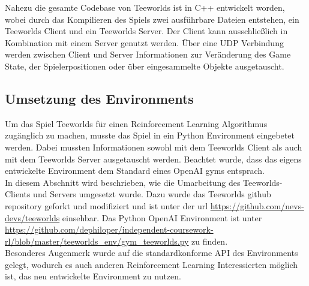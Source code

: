 \documentclass[11pt]{scrartcl}
\begin{document}
Nahezu die gesamte Codebase von Teeworlds ist in C++ entwickelt worden, wobei durch das Kompilieren
des Spiels zwei ausführbare Dateien entstehen, ein Teeworlds Client und ein Teeworlds Server. Der
Client kann ausschließlich in Kombination mit einem Server genutzt werden. Über eine UDP Verbindung
werden zwischen Client und Server Informationen zur Veränderung des Game State, der Spielerpositionen
oder über eingesammelte Objekte ausgetauscht.

\subsection{Umsetzung des Environments} %
Um das Spiel Teeworlds für einen Reinforcement Learning Algorithmus zugänglich zu machen,
musste das Spiel in ein Python Environment eingebetet werden. Dabei mussten Informationen
sowohl mit dem Teeworlds Client als auch mit dem Teeworlds Server ausgetauscht werden.
Beachtet wurde, dass das eigens entwickelte Environment dem Standard eines OpenAI gyms
entsprach.\\
In diesem Abschnitt wird beschrieben, wie die Umarbeitung des Teeworlds-Clients und
Servers umgesetzt wurde. Dazu wurde das Teeworlds github repository geforkt und
modifiziert und ist unter der url \url{https://github.com/nevs-devs/teeworlds} einsehbar.
Das Python OpenAI Environment ist unter
\url{https://github.com/dephiloper/independent-coursework-rl/blob/master/teeworlds_env/gym_teeworlds.py}
zu finden.\\
Besonderes Augenmerk wurde auf die standardkonforme API des Environments gelegt, wodurch
es auch anderen Reinforcement Learning Interessierten möglich ist, das neu entwickelte
Environment zu nutzen.
\end{document}
